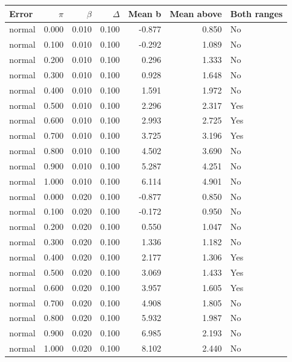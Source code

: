 \begin{tabular}{lrrrrrl}
\toprule
Error & $\pi$ & $\beta$ & $\Delta$ & Mean b & Mean above & Both ranges \\
\midrule
normal & 0.000 & 0.010 & 0.100 & -0.877 & 0.850 & No \\
normal & 0.100 & 0.010 & 0.100 & -0.292 & 1.089 & No \\
normal & 0.200 & 0.010 & 0.100 & 0.296 & 1.333 & No \\
normal & 0.300 & 0.010 & 0.100 & 0.928 & 1.648 & No \\
normal & 0.400 & 0.010 & 0.100 & 1.591 & 1.972 & No \\
normal & 0.500 & 0.010 & 0.100 & 2.296 & 2.317 & Yes \\
normal & 0.600 & 0.010 & 0.100 & 2.993 & 2.725 & Yes \\
normal & 0.700 & 0.010 & 0.100 & 3.725 & 3.196 & Yes \\
normal & 0.800 & 0.010 & 0.100 & 4.502 & 3.690 & No \\
normal & 0.900 & 0.010 & 0.100 & 5.287 & 4.251 & No \\
normal & 1.000 & 0.010 & 0.100 & 6.114 & 4.901 & No \\
normal & 0.000 & 0.020 & 0.100 & -0.877 & 0.850 & No \\
normal & 0.100 & 0.020 & 0.100 & -0.172 & 0.950 & No \\
normal & 0.200 & 0.020 & 0.100 & 0.550 & 1.047 & No \\
normal & 0.300 & 0.020 & 0.100 & 1.336 & 1.182 & No \\
normal & 0.400 & 0.020 & 0.100 & 2.177 & 1.306 & Yes \\
normal & 0.500 & 0.020 & 0.100 & 3.069 & 1.433 & Yes \\
normal & 0.600 & 0.020 & 0.100 & 3.957 & 1.605 & Yes \\
normal & 0.700 & 0.020 & 0.100 & 4.908 & 1.805 & No \\
normal & 0.800 & 0.020 & 0.100 & 5.932 & 1.987 & No \\
normal & 0.900 & 0.020 & 0.100 & 6.985 & 2.193 & No \\
normal & 1.000 & 0.020 & 0.100 & 8.102 & 2.440 & No \\
\bottomrule
\end{tabular}
\par\medskip

